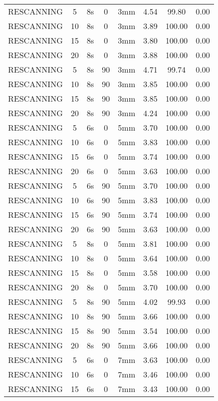 \begin{table}[H]
\begin{tabular}{|c|c||c|c|c||c|c|c|}
RESCANNING & 5 & 8s & 0 & 3mm & 4.54 & 99.80 & 0.00 \\
RESCANNING & 10 & 8s & 0 & 3mm & 3.89 & 100.00 & 0.00 \\
RESCANNING & 15 & 8s & 0 & 3mm & 3.80 & 100.00 & 0.00 \\
RESCANNING & 20 & 8s & 0 & 3mm & 3.88 & 100.00 & 0.00 \\
RESCANNING & 5 & 8s & 90 & 3mm & 4.71 & 99.74 & 0.00 \\
RESCANNING & 10 & 8s & 90 & 3mm & 3.85 & 100.00 & 0.00 \\
RESCANNING & 15 & 8s & 90 & 3mm & 3.85 & 100.00 & 0.00 \\
RESCANNING & 20 & 8s & 90 & 3mm & 4.24 & 100.00 & 0.00 \\
RESCANNING & 5 & 6s & 0 & 5mm & 3.70 & 100.00 & 0.00 \\
RESCANNING & 10 & 6s & 0 & 5mm & 3.83 & 100.00 & 0.00 \\
RESCANNING & 15 & 6s & 0 & 5mm & 3.74 & 100.00 & 0.00 \\
RESCANNING & 20 & 6s & 0 & 5mm & 3.63 & 100.00 & 0.00 \\
RESCANNING & 5 & 6s & 90 & 5mm & 3.70 & 100.00 & 0.00 \\
RESCANNING & 10 & 6s & 90 & 5mm & 3.83 & 100.00 & 0.00 \\
RESCANNING & 15 & 6s & 90 & 5mm & 3.74 & 100.00 & 0.00 \\
RESCANNING & 20 & 6s & 90 & 5mm & 3.63 & 100.00 & 0.00 \\
RESCANNING & 5 & 8s & 0 & 5mm & 3.81 & 100.00 & 0.00 \\
RESCANNING & 10 & 8s & 0 & 5mm & 3.64 & 100.00 & 0.00 \\
RESCANNING & 15 & 8s & 0 & 5mm & 3.58 & 100.00 & 0.00 \\
RESCANNING & 20 & 8s & 0 & 5mm & 3.70 & 100.00 & 0.00 \\
RESCANNING & 5 & 8s & 90 & 5mm & 4.02 & 99.93 & 0.00 \\
RESCANNING & 10 & 8s & 90 & 5mm & 3.66 & 100.00 & 0.00 \\
RESCANNING & 15 & 8s & 90 & 5mm & 3.54 & 100.00 & 0.00 \\
RESCANNING & 20 & 8s & 90 & 5mm & 3.66 & 100.00 & 0.00 \\
RESCANNING & 5 & 6s & 0 & 7mm & 3.63 & 100.00 & 0.00 \\
RESCANNING & 10 & 6s & 0 & 7mm & 3.46 & 100.00 & 0.00 \\
RESCANNING & 15 & 6s & 0 & 7mm & 3.43 & 100.00 & 0.00 \\

\end{tabular}
\end{table}
